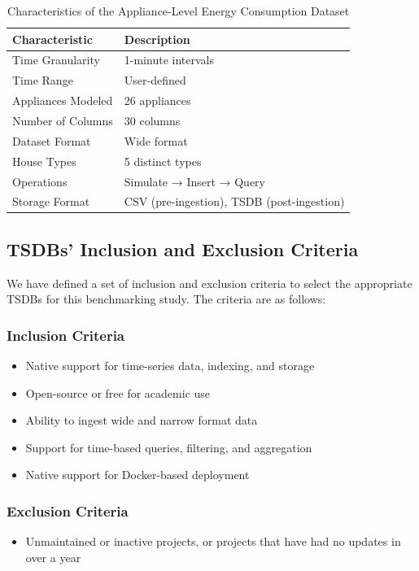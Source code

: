 \documentclass[conference]{IEEEtran}
\begin{document}
\begin{table}[htbp]
\caption{Characteristics of the Appliance-Level Energy Consumption Dataset}
\begin{center}
\begin{tabular}{|l|l|}
\hline
\textbf{Characteristic} & \textbf{Description} \\
\hline
Time Granularity & 1-minute intervals \\
Time Range & User-defined \\
Appliances Modeled & 26 appliances \\
Number of Columns & 30 columns \\
Dataset Format & Wide format \\
House Types & 5 distinct types \\
Operations & Simulate → Insert → Query \\
Storage Format & CSV (pre-ingestion), TSDB (post-ingestion) \\
\hline
\end{tabular}
\label{tab:dataset_characteristics}
\end{center}
\end{table}

\subsection{TSDBs' Inclusion and Exclusion Criteria}
We have defined a set of inclusion and exclusion criteria to select the appropriate TSDBs for this benchmarking study. The criteria are as follows:
\subsubsection{Inclusion Criteria}
\begin{itemize}
    \item Native support for time-series data, indexing, and storage
    \item Open-source or free for academic use
    \item Ability to ingest wide and narrow format data
    \item Support for time-based queries, filtering, and aggregation
    \item Native support for Docker-based deployment
\end{itemize}
\subsubsection{Exclusion Criteria}
\begin{itemize}
    \item Unmaintained or inactive projects, or projects that have had no updates in over a year
\end{itemize}
\end{document}
